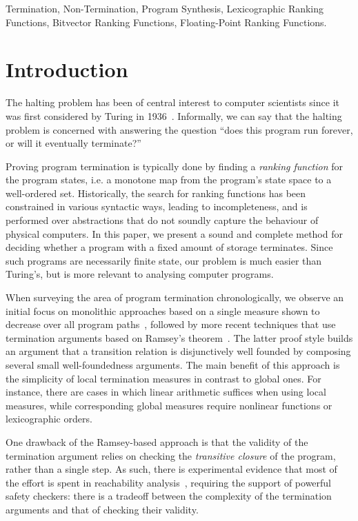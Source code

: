\documentclass[preprint]{sigplanconf}
\theoremstyle{definition}
\begin{document}

\keywords
Termination, Non-Termination, Program Synthesis,
Lexicographic Ranking Functions, Bitvector Ranking Functions, Floating-Point Ranking Functions.

\section{Introduction}\label{sec:intro}

The halting problem has been of central interest to computer scientists
since it was first considered by Turing in 1936~\cite{turing}.  Informally,
we can say that the halting problem is concerned with answering the question
``does this program run forever, or will it eventually terminate?''

Proving program termination is typically done by finding a \emph{ranking
function} for the program states, i.e.  a monotone map from the program's
state space to a well-ordered set.  Historically, the search for ranking
functions has been constrained in various syntactic ways, leading to
incompleteness, and is performed over abstractions that do not soundly
capture the behaviour of physical computers.  In this paper, we present a
sound and complete method for deciding whether a program with a fixed amount of
storage terminates.  Since such programs are necessarily finite state, our
problem is much easier than Turing's, but is more relevant to analysing computer
programs.

When surveying the area of program termination chronologically, we observe
an initial focus on monolithic approaches based on a single measure shown to
decrease over all program
paths~\cite{DBLP:conf/vmcai/P04,DBLP:conf/cav/BradleyMS05}, followed by more
recent techniques that use termination arguments based on Ramsey's
theorem~\cite{DBLP:conf/lpe/CodishG03,DBLP:conf/lics/PodelskiR04,DBLP:conf/pldi/CookPR06}.
The latter proof style builds an argument that a transition relation is disjunctively well founded
by composing several small well-foundedness arguments.
The main benefit of this approach is
the simplicity of local termination measures in contrast to global ones. 
For instance, there are cases in which linear arithmetic suffices when using
local measures, while corresponding global measures require nonlinear
functions or lexicographic orders.

One drawback of the Ramsey-based approach is that the validity of the
termination argument relies on checking the \emph{transitive closure} of the
program, rather than a single step.  As such, there is experimental evidence
that most of the effort is spent in reachability
analysis~\cite{DBLP:conf/pldi/CookPR06,DBLP:conf/cav/KroeningSTW10},
requiring the support of powerful safety checkers: there is a tradeoff
between the complexity of the termination arguments and that of checking
their validity.
\end{document}
